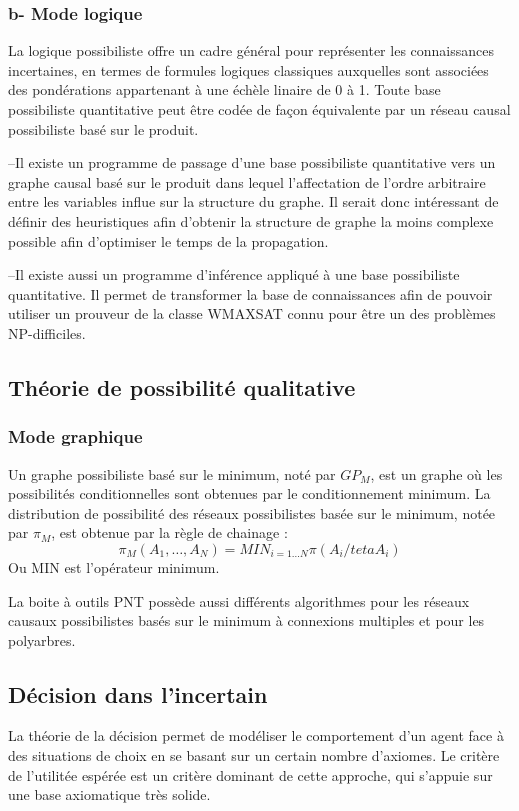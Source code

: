 \subsubsection{b- Mode logique}
La logique possibiliste offre un cadre général pour représenter les connaissances incertaines, en termes de formules logiques classiques auxquelles sont associées des pondérations appartenant à une échèle linaire de 0 à 1. Toute base possibiliste quantitative peut être codée de façon équivalente par un réseau causal possibiliste basé sur le produit.

–Il existe un programme de passage d’une base possibiliste quantitative vers un graphe causal basé sur le produit dans lequel l’affectation de l’ordre arbitraire entre les variables influe sur la structure du graphe. Il serait donc intéressant de définir des heuristiques afin d’obtenir la structure de graphe la moins complexe possible afin d’optimiser
le temps de la propagation.

–Il existe aussi un programme d’inférence appliqué à une base possibiliste quantitative. Il permet de transformer la base de connaissances afin de pouvoir utiliser un prouveur de la classe WMAXSAT connu pour être un des problèmes NP-difficiles.\cite{hkhallafiThesis}

\subsection{Théorie de possibilité qualitative}
\subsubsection{Mode graphique}

Un graphe possibiliste basé sur le minimum, noté par $GP_{M}$, est un graphe où les possibilités conditionnelles sont obtenues par le conditionnement minimum. La distribution de possibilité des réseaux possibilistes basée sur le minimum, notée par $\pi_{M}$, est obtenue par la règle de chainage :
\begin{equation}
 \pi_{M} (A_1, \dots, A_N) = MIN_{i=1 \dots N} \pi (A_i/teta A_i) 
\end{equation}
Ou MIN est  l’opérateur minimum.\cite{BoBrDu2008.1}

La boite à outils PNT possède aussi différents algorithmes pour les réseaux causaux possibilistes basés sur le minimum à connexions multiples et pour les polyarbres. 

\subsection{Décision dans l’incertain}
La théorie de la décision permet de modéliser le comportement d'un agent face
à des situations de choix en se basant sur un certain nombre d'axiomes. Le critère
de l'utilitée espérée est un critère dominant de cette approche, qui s'appuie sur une
base axiomatique très solide.\cite{hkhaoulaThesis}
